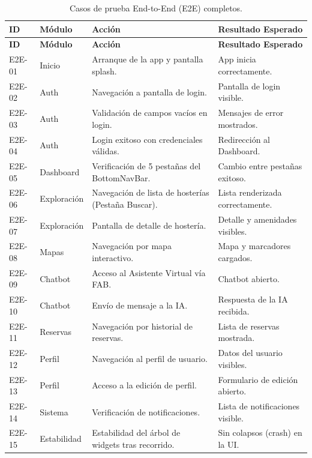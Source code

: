 \documentclass[12pt,letterpaper]{report}
\begin{document}
\begin{longtable}{p{1.5cm}p{2.5cm}p{5.5cm}p{4cm}}
\caption{Casos de prueba End-to-End (E2E) completos.}\\
\toprule
\textbf{ID} & \textbf{Módulo} & \textbf{Acción} & \textbf{Resultado Esperado}\\
\midrule
\endfirsthead
\toprule
\textbf{ID} & \textbf{Módulo} & \textbf{Acción} & \textbf{Resultado Esperado}\\
\midrule
\endhead
E2E-01 & Inicio & Arranque de la app y pantalla splash. & App inicia correctamente.\\
E2E-02 & Auth & Navegación a pantalla de login. & Pantalla de login visible.\\
E2E-03 & Auth & Validación de campos vacíos en login. & Mensajes de error mostrados.\\
E2E-04 & Auth & Login exitoso con credenciales válidas. & Redirección al Dashboard.\\
E2E-05 & Dashboard & Verificación de 5 pestañas del BottomNavBar. & Cambio entre pestañas exitoso.\\
E2E-06 & Exploración & Navegación de lista de hosterías (Pestaña Buscar). & Lista renderizada correctamente.\\
E2E-07 & Exploración & Pantalla de detalle de hostería. & Detalle y amenidades visibles.\\
E2E-08 & Mapas & Navegación por mapa interactivo. & Mapa y marcadores cargados.\\
E2E-09 & Chatbot & Acceso al Asistente Virtual vía FAB. & Chatbot abierto.\\
E2E-10 & Chatbot & Envío de mensaje a la IA. & Respuesta de la IA recibida.\\
E2E-11 & Reservas & Navegación por historial de reservas. & Lista de reservas mostrada.\\
E2E-12 & Perfil & Navegación al perfil de usuario. & Datos del usuario visibles.\\
E2E-13 & Perfil & Acceso a la edición de perfil. & Formulario de edición abierto.\\
E2E-14 & Sistema & Verificación de notificaciones. & Lista de notificaciones visible.\\
E2E-15 & Estabilidad & Estabilidad del árbol de widgets tras recorrido. & Sin colapsos (crash) en la UI.\\
\bottomrule
\end{longtable}
\end{document}
